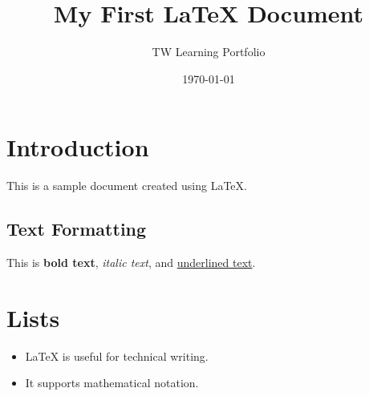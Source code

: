 \documentclass[12pt,a4paper]{article}
\title{My First LaTeX Document}
\author{TW Learning Portfolio}
\date{\today}
\begin{document}
\maketitle

\section{Introduction}
This is a sample document created using LaTeX.

\subsection{Text Formatting}
This is \textbf{bold text}, \textit{italic text}, and
\underline{underlined text}.

\section{Lists}
\begin{itemize}
    \item LaTeX is useful for technical writing.
    \item It supports mathematical notation.
\end{itemize}
\end{document}
